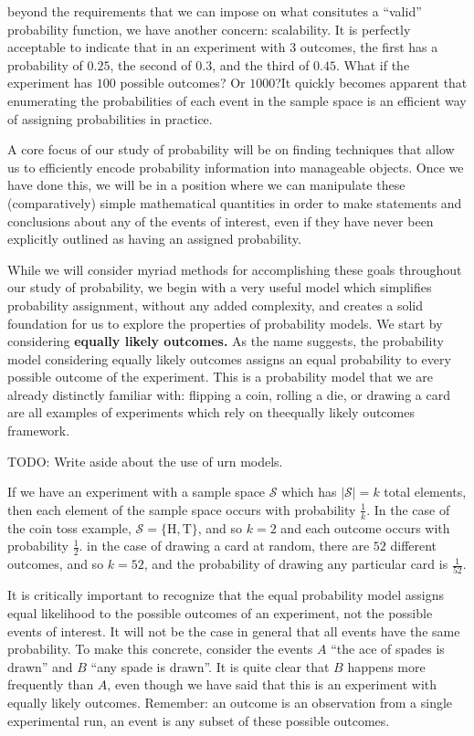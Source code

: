 \documentclass[
  letterpaper,
  DIV=11,
  numbers=noendperiod]{scrreprt}
\begin{document}
beyond the requirements that we can impose on what consitutes a
``valid'' probability function, we have another concern: scalability. It
is perfectly acceptable to indicate that in an experiment with \(3\)
outcomes, the first has a probability of \(0.25\), the second of
\(0.3\), and the third of \(0.45\). What if the experiment has \(100\)
possible outcomes? Or \(1000\)?It quickly becomes apparent that
enumerating the probabilities of each event in the sample space is an
efficient way of assigning probabilities in practice.

A core focus of our study of probability will be on finding techniques
that allow us to efficiently encode probability information into
manageable objects. Once we have done this, we will be in a position
where we can manipulate these (comparatively) simple mathematical
quantities in order to make statements and conclusions about any of the
events of interest, even if they have never been explicitly outlined as
having an assigned probability.

While we will consider myriad methods for accomplishing these goals
throughout our study of probability, we begin with a very useful model
which simplifies probability assignment, without any added complexity,
and creates a solid foundation for us to explore the properties of
probability models. We start by considering \textbf{equally likely
outcomes.} As the name suggests, the probability model considering
equally likely outcomes assigns an equal probability to every possible
outcome of the experiment. This is a probability model that we are
already distinctly familiar with: flipping a coin, rolling a die, or
drawing a card are all examples of experiments which rely on theequally
likely outcomes framework.

TODO: Write aside about the use of urn models.

If we have an experiment with a sample space \(\mathcal{S}\) which has
\(|\mathcal{S}| = k\) total elements, then each element of the sample
space occurs with probability \(\frac{1}{k}\). In the case of the coin
toss example, \(\mathcal{S} = \{\text{H}, \text{T}\}\), and so \(k=2\)
and each outcome occurs with probability \(\frac{1}{2}\). in the case of
drawing a card at random, there are \(52\) different outcomes, and so
\(k=52\), and the probability of drawing any particular card is
\(\frac{1}{52}\).

It is critically important to recognize that the equal probability model
assigns equal likelihood to the possible outcomes of an experiment, not
the possible events of interest. It will not be the case in general that
all events have the same probability. To make this concrete, consider
the events \(A\) ``the ace of spades is drawn'' and \(B\) ``any spade is
drawn''. It is quite clear that \(B\) happens more frequently than
\(A\), even though we have said that this is an experiment with equally
likely outcomes. Remember: an outcome is an observation from a single
experimental run, an event is any subset of these possible outcomes.
\end{document}
